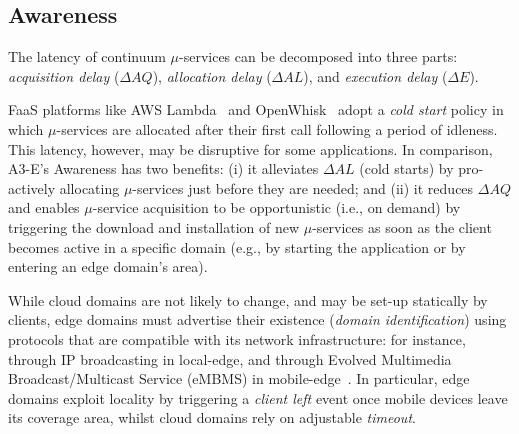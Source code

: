 

\subsection{Awareness}\label{sec:A3-E-awareness}






The latency of continuum $\mu$-services can be decomposed into three parts: \textit{acquisition delay} ($\Delta AQ$), \textit{allocation delay} ($\Delta AL$), and \textit{execution delay} ($\Delta E$). 

FaaS platforms like AWS Lambda~\cite{AWSLambda}
and OpenWhisk~\cite{OpenWhisk} adopt a \textit{cold start} policy in which $\mu$-services are allocated after their first call following a period of idleness. This latency, however, may be disruptive for some applications. 
In comparison, %
A3-E's Awareness has two benefits: (i) it alleviates $\Delta AL$ (cold starts) by pro-actively allocating $\mu$-services just before they are needed; and (ii) it reduces $\Delta AQ$ and enables $\mu$-service acquisition to be opportunistic (i.e., on demand) by triggering the download and installation of new $\mu$-services as soon as the client becomes active in a specific domain (e.g., by starting the application or by entering an edge domain's area).

While cloud domains are not likely to change, and may be set-up statically by clients,%
edge domains must advertise their existence (\textit{domain identification}) using protocols that are compatible with its network infrastructure: for instance, through IP broadcasting in local-edge, and through Evolved Multimedia Broadcast/Multicast Service (eMBMS) in mobile-edge~\cite{lecompte2012evolved,etsimec16:03}. 
In particular, edge domains exploit locality by triggering a \textit{client left} event once mobile devices leave its coverage area, whilst cloud domains rely on adjustable \textit{timeout}.%

